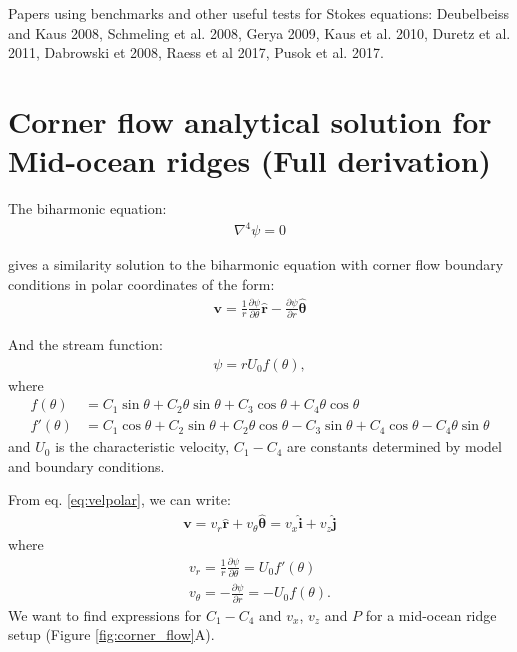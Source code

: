 \documentclass[a4paper,11pt]{article}
\begin{document}
Papers using benchmarks and other useful tests for Stokes equations:
Deubelbeiss and Kaus 2008, Schmeling et al. 2008, Gerya 2009, Kaus et al. 2010, Duretz et al. 2011, Dabrowski et 2008, Raess et al 2017, Pusok et al. 2017.

\appendix

\section{Corner flow analytical solution for Mid-ocean ridges (Full derivation)} \label{App:AppendixA}

The biharmonic equation:
\begin{align}
\nabla^4\psi= 0
\end{align}

\citet{Batchelor2000} gives a similarity solution to the biharmonic equation with corner flow boundary conditions in polar coordinates of the form:
\begin{align}
\textbf{v} = \frac{1}{r}\frac{\partial\psi}{\partial\theta}\hat{\textbf{r}}-\frac{\partial\psi}{\partial r}\hat{\bm{\theta}} \label{eq:velpolar}
\end{align}

And the stream function:
\begin{align}
\psi = r U_0 f(\theta),
\end{align}
where
\begin{align}
f(\theta) &= C_1\sin\theta+C_2\theta\sin\theta+C_3\cos\theta+C_4\theta\cos\theta \\
f'(\theta) &= C_1\cos\theta+C_2\sin\theta+C_2\theta\cos\theta-C_3\sin\theta+C_4\cos\theta-C_4\theta\sin\theta 
\end{align}
and $U_0$ is the characteristic velocity, $C_1-C_4$ are constants determined by model and boundary conditions. 

From eq. \ref{eq:velpolar}, we can write:
\begin{align}
\textbf{v} = v_r\hat{\textbf{r}}+v_\theta\hat{\bm{\theta}} = v_x\hat{\textbf{i}}+v_z\hat{\textbf{j}} \label{eq:vgen}
\end{align}
where 
\begin{align}
v_r= \frac{1}{r}\frac{\partial\psi}{\partial\theta} = U_0 f'(\theta)\\
v_\theta=-\frac{\partial\psi}{\partial r} = -U_0 f(\theta). 
\end{align}
We want to find expressions for $C_1-C_4$ and $v_x$, $v_z$ and $P$ for a mid-ocean ridge setup (Figure \ref{fig:corner_flow}A).
\end{document}
